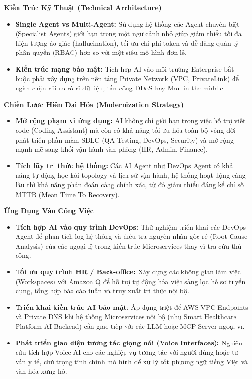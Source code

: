 \vspace{0.5em}\noindent\textbf{Kiến Trúc Kỹ Thuật (Technical Architecture)}

\begin{itemize}
\tightlist
\item
  \textbf{Single Agent vs Multi-Agent:} Sử dụng hệ thống các Agent
  chuyên biệt (Specialist Agents) giới hạn trong một ngữ cảnh nhỏ giúp
  giảm thiểu tối đa hiện tượng ảo giác (hallucination), tối ưu chi phí
  token và dễ dàng quản lý phân quyền (RBAC) hơn so với một siêu mô hình
  đơn lẻ.
\item
  \textbf{Kiến trúc mạng bảo mật:} Tích hợp AI vào môi trường Enterprise
  bắt buộc phải xây dựng trên nền tảng Private Network (VPC,
  PrivateLink) để ngăn chặn rủi ro rò rỉ dữ liệu, tấn công DDoS hay
  Man-in-the-middle.
\end{itemize}

\vspace{0.5em}\noindent\textbf{Chiến Lược Hiện Đại Hóa (Modernization Strategy)}

\begin{itemize}
\tightlist
\item
  \textbf{Mở rộng phạm vi ứng dụng:} AI không chỉ giới hạn trong việc hỗ
  trợ viết code (Coding Assistant) mà còn có khả năng tối ưu hóa toàn bộ
  vòng đời phát triển phần mềm SDLC (QA Testing, DevOps, Security) và mở
  rộng mạnh mẽ sang khối vận hành văn phòng (HR, Admin, Finance).
\item
  \textbf{Tích lũy tri thức hệ thống:} Các AI Agent như DevOps Agent có
  khả năng tự động học hỏi topology và lịch sử vận hành, hệ thống hoạt
  động càng lâu thì khả năng phán đoán càng chính xác, từ đó giảm thiểu
  đáng kể chỉ số MTTR (Mean Time To Recovery).
\end{itemize}

\vspace{0.5em}\noindent\textbf{Ứng Dụng Vào Công Việc}

\begin{itemize}
\tightlist
\item
  \textbf{Tích hợp AI vào quy trình DevOps:} Thử nghiệm triển khai các
  DevOps Agent để phân tích log hệ thống và điều tra nguyên nhân gốc rễ
  (Root Cause Analysis) của các ngoại lệ trong kiến trúc Microservices
  thay vì tra cứu thủ công.
\item
  \textbf{Tối ưu quy trình HR / Back-office:} Xây dựng các không gian
  làm việc (Workspaces) với Amazon Q để hỗ trợ tự động hóa việc sàng lọc
  hồ sơ tuyển dụng, tổng hợp báo cáo tuần và truy xuất tri thức nội bộ.
\item
  \textbf{Triển khai kiến trúc AI bảo mật:} Áp dụng triệt để AWS VPC
  Endpoints và Private DNS khi hệ thống Microservices nội bộ (như Smart
  Healthcare Platform AI Backend) cần giao tiếp với các LLM hoặc MCP
  Server ngoại vi.
\item
  \textbf{Phát triển giao diện tương tác giọng nói (Voice Interfaces):}
  Nghiên cứu tích hợp Voice AI cho các nghiệp vụ tương tác với người
  dùng hoặc tư vấn y tế, chú trọng tinh chỉnh mô hình để xử lý tốt
  phương ngữ tiếng Việt và văn hóa xưng hô.
\end{itemize}

